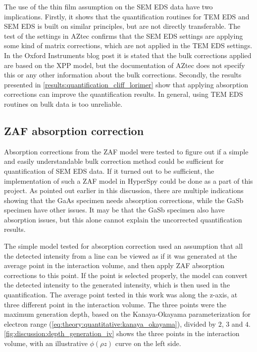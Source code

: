 The use of the thin film assumption on the SEM EDS data have two implications.
Firstly, it shows that the quantification routines for TEM EDS and SEM EDS is built on similar principles, but are not directly transferable.
The test of the settings in AZtec confirms that the SEM EDS settings are applying some kind of matrix corrections, which are not applied in the TEM EDS settings.
In the Oxford Instruments blog post\cite{oxford_blog_XPP} it is stated that the bulk corrections applied are based on the XPP model, but the documentation of AZtec does not specify this or any other information about the bulk corrections\cite{aztec_manual}.
Secondly, the results presented in \cref{results:quantification_cliff_lorimer} show that applying absorption corrections can improve the quantification results.
In general, using TEM EDS routines on bulk data is too unreliable.





\subsection{ZAF absorption correction}
\label{discussion:quantitative:zaf_absorption_correction}

Absorption corrections from the ZAF model were tested to figure out if a simple and easily understandable bulk correction method could be sufficient for quantification of SEM EDS data.
If it turned out to be sufficient, the implementation of such a ZAF model in HyperSpy could be done as a part of this project.
As pointed out earlier in this discussion, there are multiple indications showing that the GaAs specimen needs absorption corrections, while the GaSb specimen have other issues.
It may be that the GaSb specimen also have absorption issues, but this alone cannot explain the uncorrected quantification results.


The simple model tested for absorption correction used an assumption that all the detected intensity from a line can be viewed as if it was generated at the average point in the interaction volume, and then apply ZAF absorption corrections to this point.
If the point is selected properly, the model can convert the detected intensity to the generated intensity, which is then used in the quantification.
The average point tested in this work was along the z-axis, at three different point in the interaction volume.
The three points were the maximum generation depth, based on the Kanaya-Okayama parameterization for electron range (\cref{eq:theory:quantitative:kanaya_okayama}), divided by $2$, $3$ and $4$.
\cref{fig:discussion:depth_generation_iv} shows the three points in the interaction volume, with an illustrative $\phi (\rho z)$ curve on the left side.


